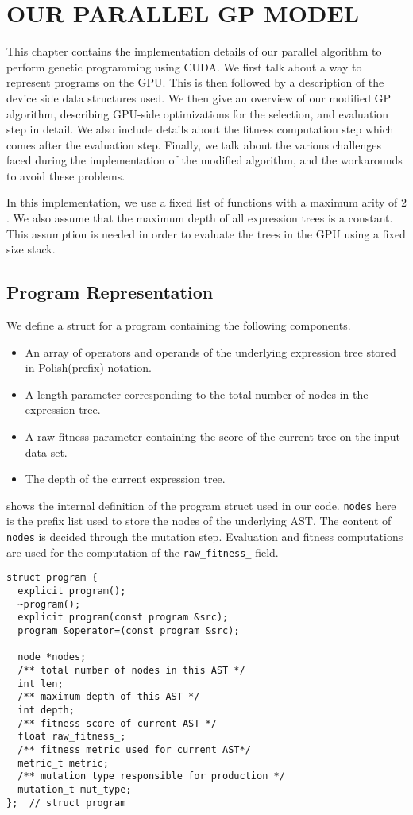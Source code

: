 \chapter{OUR PARALLEL GP MODEL}
\label{chap:ourwork}
This chapter contains the implementation details of our parallel algorithm to perform genetic programming using CUDA. We first talk about a way to represent programs on the GPU. This is then followed by a description of the device side data structures used. We then give an overview of our modified GP algorithm, describing GPU-side optimizations for the selection, and evaluation step in detail. We also include details about the fitness computation step which comes after the evaluation step. Finally, we talk about the various challenges faced during the implementation of the modified algorithm, and the workarounds to avoid these problems.

In this implementation, we use a fixed list of functions with a maximum arity of $2$. We also assume that the maximum depth of all expression trees is a constant. This assumption is needed in order to evaluate the trees in the GPU using a fixed size stack.

\section{Program Representation}
\label{ow:input}
We define a struct for a program containing the following components. 
\begin{itemize}
    \item An array of operators and operands of the underlying expression tree stored in Polish(prefix) notation.
    \item A length parameter corresponding to the total number of nodes in the expression tree. 
    \item A raw fitness parameter containing the score of the current tree on the input data-set. 
    \item The depth of the current expression tree. 
\end{itemize}

 shows the internal definition of the program struct used in our code. \lstinline!nodes! here is the prefix list used to store the nodes of the underlying AST. The content of \lstinline!nodes! is decided through the mutation step. Evaluation and fitness computations are used for the computation of the \lstinline!raw_fitness_! field.

\begin{lstlisting}[caption={Our code for the program struct, representing a single expression tree. This entire structure is copied over and evaluated on the GPU.},label={lst:programstruct}]
struct program {
  explicit program();
  ~program();
  explicit program(const program &src);
  program &operator=(const program &src);

  node *nodes;
  /** total number of nodes in this AST */
  int len;
  /** maximum depth of this AST */
  int depth;
  /** fitness score of current AST */
  float raw_fitness_;
  /** fitness metric used for current AST*/
  metric_t metric;
  /** mutation type responsible for production */
  mutation_t mut_type;
};  // struct program
\end{lstlisting}

